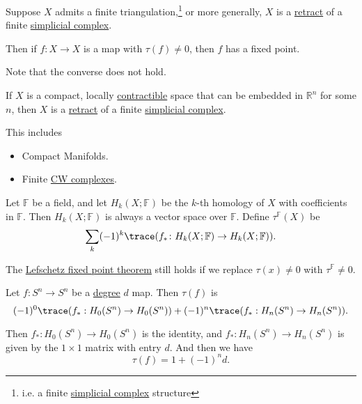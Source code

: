 \begin{theorem}\label{thm:Lefschetz-fixed-point}
	Suppose \(X\) admits a finite triangulation,\footnote{i.e. a finite \hyperref[def:simplicial-complex]{simplicial complex} structure}
	or more generally, \(X\) is a \hyperref[def:retraction]{retract} of a finite \hyperref[def:simplicial-complex]{simplicial complex}.

	Then if \(f \colon X \to X\) is a map with \(\tau(f) \neq 0\), then \(f\) has a fixed point.
\end{theorem}
\begin{note}
	Note that the converse does not hold.
\end{note}
\begin{theorem}\label{thm:retract-simplicial-complex}
	If \(X\) is a compact, locally \hyperref[def:contractible]{contractible} space that can be embedded in \(\mathbb{R}^n\) for some \(n\), then \(X\) is a
	\hyperref[def:retraction]{retract} of a finite \hyperref[def:simplicial-complex]{simplicial complex}.
\end{theorem}
\begin{remark}
	This includes
	\begin{itemize}
		\item Compact Manifolds.
		\item Finite \hyperref[def:CW-Complex]{CW complexes}.
	\end{itemize}
\end{remark}
\begin{definition}\label{def:Lefschetz-number-better}
	Let \(\mathbb{F}\) be a field, and let \(H_k(X; \mathbb{F})\) be the \(k\)-th homology of \(X\) with coefficients in \(\mathbb{F}\).
	Then \(H_k(X; \mathbb{F})\) is always a vector space over \(\mathbb{F}\). Define \(\tau^{\mathbb{F}}(X)\) be
	\[
		\sum_k (-1)^k \trace(f_\ast \colon H_k(X; \mathbb{F}) \to H_k(X; \mathbb{F})).
	\]
\end{definition}
\begin{remark}
	The \hyperref[thm:Lefschetz-fixed-point]{Lefschetz fixed point theorem} still holds if we replace \(\tau(x) \neq 0\) with \(\tau^{\mathbb{F}} \neq 0\).
\end{remark}
\begin{eg}
	Let \(f \colon S^n \to S^n\) be a \hyperref[def:degree]{degree} \(d\) map. Then \(\tau(f)\) is
	\[
		(-1)^0\trace(f_\ast : H_0(S^n) \to H_0(S^n)) + (-1)^n\trace(f_\ast : H_n(S^n) \to H_n(S^n)).
	\]

	Then \(f_\ast \colon H_0(S^n) \to H_0(S^n)\) is the identity, and \(f_\ast \colon H_n(S^n) \to H_n(S^n)\) is given by the
	\(1 \times 1\) matrix with entry \(d\). And then we have
	\[
		\tau(f) = 1 + (-1)^n d.
	\]
\end{eg}

